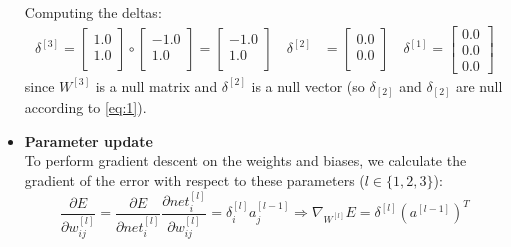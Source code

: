 \documentclass{exam}
\begin{document}
\begin{questions}
\begin{itemize}
\begin{equation}
                \label{eq:2}
            \end{equation}
            Computing the deltas:
            \begin{align*}
                \delta^{[3]} = 
                \begin{bmatrix}
                    1.0  \\
                    1.0 \\
                \end{bmatrix} \circ
                \begin{bmatrix}
                    -1.0  \\
                    1.0  \\
                \end{bmatrix} = 
                \begin{bmatrix}
                    -1.0  \\
                    1.0  \\
                \end{bmatrix} \quad
                \delta^{[2]} &= 
                \begin{bmatrix}
                    0.0  \\
                    0.0  \\
                \end{bmatrix} \quad
                \delta^{[1]} = 
                \begin{bmatrix}
                    0.0  \\
                    0.0  \\
                    0.0
                \end{bmatrix}
            \end{align*} 
            since $W^{[3]}$ is a null matrix and $\delta^{[2]}$ is a null vector (so $\delta_{[2]}$ and $\delta_{[2]}$ are null according to \eqref{eq:1}).
            \item \textbf{Parameter update} \\
            To perform gradient descent on the weights and biases, we calculate the gradient of the error with respect to these parameters ($l \in \{1, 2, 3\}$):
            \begin{equation}
                \frac{\partial E}{\partial w_{ij}^{[l]}} = \frac{\partial E}{\partial net_{i}^{[l]}} \frac{\partial net_i^{[l]}}{\partial w_{ij}^{[l]}} = \delta_i^{[l]} a_j^{[l - 1]} \Rightarrow \nabla_{W^{[l]}} E = \delta^{[l]} (a^{[l - 1]})^{T} \label{eq:3}
            \end{equation}

\end{itemize}
\end{questions}
\end{document}
